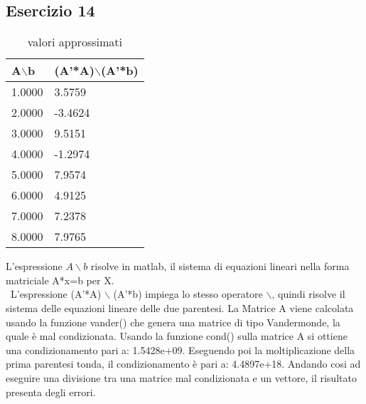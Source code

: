 \subsection{Esercizio 14}

\begin{table}[h]
\begin{tabular}{|l l|}
        \hline
        A$\backslash$b & (A’*A)$\backslash$(A’*b)\\
        \hline
        1.0000& 3.5759 \\
    	2.0000&-3.4624   \\
    	3.0000&  9.5151\\
    	4.0000&-1.2974\\
    	5.0000& 7.9574\\
    	6.0000& 4.9125\\
    	7.0000& 7.2378\\
    	8.0000& 7.9765\\
        \hline
\end{tabular}
\caption{valori approssimati}
\label{tab:14}     
\end{table}

L'espressione $A \backslash b$ risolve in matlab,  il sistema di equazioni lineari nella forma matriciale A*x=b per X. \\\
L'espressione (A'*A) $\backslash$ (A'*b) impiega lo stesso operatore $\backslash$, quindi risolve il sistema delle equazioni lineare delle due parentesi.
La Matrice A viene calcolata usando la funzione vander() che genera una matrice di tipo Vandermonde, la quale è  mal condizionata. Usando la funzione cond() sulla matrice A si ottiene una condizionamento pari a: 1.5428e+09. Eseguendo poi la moltiplicazione della prima 
parentesi tonda, il condizionamento è pari a: 4.4897e+18. Andando cosi ad eseguire una divisione tra una matrice mal condizionata e un vettore, il risultato presenta degli errori.
